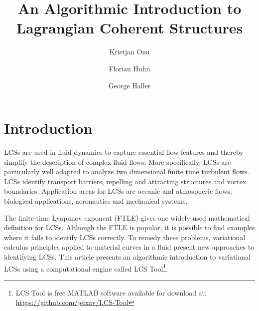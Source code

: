\documentclass{article}
\title{An Algorithmic Introduction to Lagrangian Coherent Structures}
\author{Kristjan Onu \and Florian Huhn \and George Haller}
\begin{document}

\maketitle

\tableofcontents


\section{Introduction}

LCSs are used in fluid dynamics to capture essential flow features and thereby simplify the description of complex fluid flows. More specifically, LCSs are particularly well adapted to analyze two dimensional finite time turbulent flows. LCSs identify transport barriers, repelling and attracting structures and vortex boundaries. Application areas for LCSs are oceanic and atmospheric flows, biological applications\parencite{wilson09:_lagran_reynol,tallapragada11:_lagran}, aeronautics\parencite{tang10:_accur_lagran_hong_kong_inter_airpor} and mechanical systems\parencite{hadjighasem13:_detec_kam}.

The finite-time Lyapunov exponent (FTLE) gives one widely-used mathematical definition for LCSs. Although the FTLE is popular, it is possible to find examples where it fails to identify LCSs correctly\parencite{haller11:_lagran_coher_struc,norgard12:_secon_lagran_coher_struc}. To remedy these problems, variational calculus principles applied to material curves in a fluid present new approaches to identifying LCSs\parencite{haller11:_lagran_coher_struc,farazmand12:_comput_lagran,haller12:_geodes_theor_trans_barrier_two_dimen_flows,farazmand13:_attrac_lagran,haller13:_coher_lagran}. This article presents an algorithmic introduction to variational LCSs using a computational engine called LCS Tool\footnote{LCS Tool is free MATLAB software available for download at: \url{https://github.com/jeixav/LCS-Tool}}.
\end{document}
